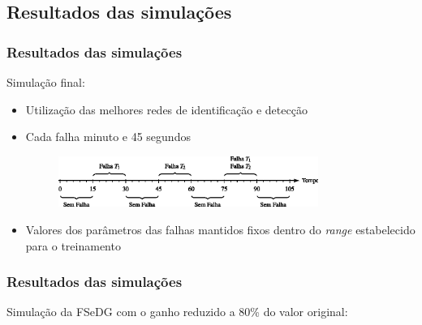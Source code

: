 \documentclass{beamer}
\begin{document}
\subsection{Resultados das simulações}

\begin{frame}
    \frametitle{Resultados das simulações}

Simulação final:    

\begin{itemize}
    \item Utilização das melhores redes de identificação e detecção
    \item Cada falha  minuto e 45 segundos
\begin{figure}[htb]
\centering
    \includegraphics[width=0.8\textwidth]{imgs/resultados/eps/intervalos}
\end{figure}
    \item Valores dos parâmetros das falhas \implica mantidos fixos dentro do
          {\it range} estabelecido para o treinamento
\end{itemize}
\end{frame}

\begin{frame}
    \frametitle{Resultados das simulações}

\footnotesize Simulação da FSeDG com o ganho reduzido a 80\% do valor original:

\begin{figure}[htb]
\footnotesize
\centering
\scalebox{0.68}{}
\end{figure}
    
\end{frame}
\end{document}
